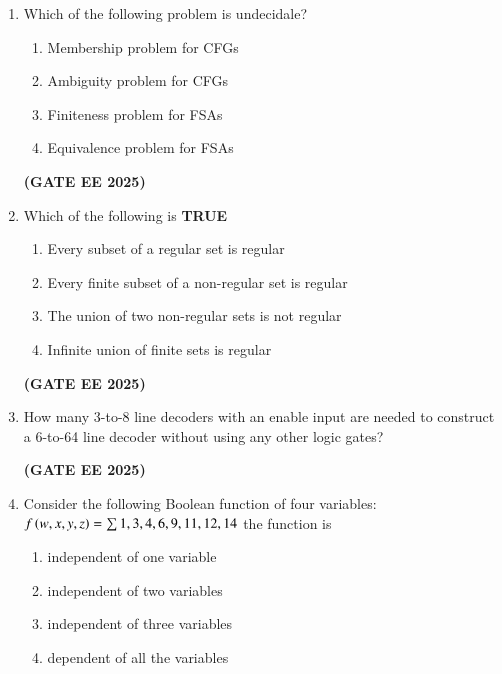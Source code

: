 \documentclass[journal,12pt,onecolumn]{IEEEtran}
\theoremstyle{remark}
\begin{document}
\begin{enumerate}
\item  Which of the following problem is undecidale? 
\begin{enumerate}

    \item  Membership problem for CFGs
    \item Ambiguity problem for CFGs
    \item Finiteness problem for FSAs
    \item Equivalence problem for FSAs

\end{enumerate}
\hfill \textbf{(GATE EE 2025)}

 
\item   Which of the following is \textbf{TRUE}
\begin{enumerate}

    \item Every subset of a regular set is regular
    \item Every finite subset of a non-regular set is regular
    \item The union of two non-regular sets is not regular
    \item Infinite union of finite sets is regular

\end{enumerate}
\hfill \textbf{(GATE EE 2025)}
\item    How many 3-to-8 line decoders with an enable input are needed to  construct a 6-to-64 line decoder without using any other logic gates?
\begin{enumerate}
\end{enumerate}
\hfill \textbf{(GATE EE 2025)}
\item    Consider the following Boolean function of four variables:
\newline
 $f\left(w,x,y,z\right)=\sum{1,3,4,6,9,11,12,14}$
 \newline
      the function is
\begin{enumerate}

    \item  independent of one variable
    \item  independent of two variables
    \item  independent of three variables
    \item  dependent of all the variables 


\end{enumerate}
\end{enumerate}
\end{document}
